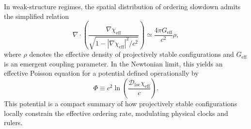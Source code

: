     In weak-structure regimes, the spatial distribution of ordering slowdown
    admits the simplified relation
    \begin{equation}
      \nabla \cdot \left(
                     \frac{\nabla \chi_{\mathrm{eff}}}
                     {\sqrt{1 - |\nabla \chi_{\mathrm{eff}}|^2 / c^2}}
      \right)
      \simeq \frac{4 \pi G_{\mathrm{eff}}}{c^2} \rho ,
      \label{eq:effective_poisson_relation}
    \end{equation}
    where $\rho$ denotes the effective density of projectively stable
    configurations and $G_{\mathrm{eff}}$ is an emergent coupling parameter.
    In the Newtonian limit, this yields an effective Poisson equation for a
    potential defined operationally by
    \begin{equation}
      \Phi \equiv c^2 \ln \!\left(
                              \frac{\mathcal{D}_{\mathrm{loc}} \chi_{\mathrm{eff}}}{c}
      \right) .
      \label{eq:effective_gravitational_potential}
    \end{equation}
    This potential is a compact summary of how projectively stable configurations
    locally constrain the effective ordering rate, modulating physical clocks
    and rulers.
